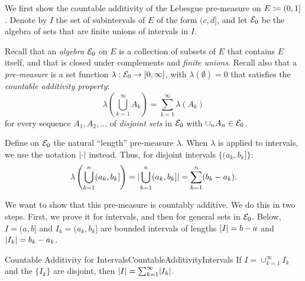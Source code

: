 We first show the countable additivity of the Lebesgue pre-measure on \(E \coloneqq \lparen 0, 1 \rbrack\). Denote by \(I\) the set of subintervals of \(E\) of the form \(\lparen c, d \rbrack\), and let \(\mathcal{E}_0\) be the algebra of sets that are finite unions of intervals in \(I\).

Recall that an \textit{algebra} \(\mathcal{E}_0\) on \(E\) is a collection of subsets of \(E\) that contains \(E\) itself, and that is closed under complements and \textit{finite unions}. Recall also that a \textit{pre-measure} is a set function \(\lambda : \mathcal{E}_0 \to [0, \infty]\), with \(\lambda(\emptyset) = 0\) that satisfies the \textit{countable additivity property}:
\begin{equation}
	\lambda\left(\bigcup_{k=1}^\infty A_k\right) = \sum_{k=1}^\infty \lambda(A_k)
	\label{eq:PreMeasureAdditivity}
\end{equation}
for every sequence \(A_1, A_2, \dots\) of \textit{disjoint sets} in \(\mathcal{E}_0\) with \(\cup_n A_n \in \mathcal{E}_0\).

Define on \(\mathcal{E}_0\) the natural ``length'' pre-measure \(\lambda\). When \(\lambda\) is applied to intervals, we use the notation \(\lvert\cdot\rvert\) instead. Thus, for disjoint intervals \(\{\lparen a_k, b_k \rbrack\}\):
\begin{equation*}
	\lambda\left(\bigcup_{k=1}^n \lparen a_k, b_k \rbrack\right) = \lvert\bigcup_{k=1}^n \lparen a_k, b_k \rbrack\rvert = \sum_{k=1}^n (b_k - a_k).
\end{equation*}

We want to show that this pre-measure is countably additive. We do this in two steps. First, we prove it for intervals, and then for general sets in \(\mathcal{E}_0\). Below, \(I = \lparen a, b \rbrack\) and \(I_k = \lparen a_k, b_k \rbrack\) are bounded intervals of lengths \(\lvert I\rvert = b - a\) and \(\lvert I_k\rvert = b_k - a_k\).

\begin{prop}{Countable Additivity for Intervals}{CountableAdditivityIntervals}
	If \(I = \cup_{k=1}^\infty I_k\) and the \(\{I_k\}\) are disjoint, then \(\lvert I\rvert = \sum_{k=1}^\infty \lvert I_k\rvert\).
\end{prop}

